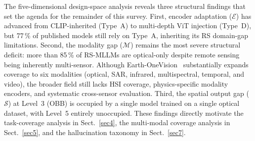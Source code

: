 The five-dimensional design-space analysis reveals three structural findings that set the
agenda for the remainder of this survey. First, encoder adaptation ($\mathcal{E}$) has
advanced from CLIP-inherited (Type~A) to multi-depth ViT injection (Type~D), but
77\,\% of published models still rely on Type~A, inheriting its RS domain-gap
limitations. Second, the modality gap ($\mathcal{M}$) remains the most severe structural
deficit: more than 85\,\% of RS-MLLMs are optical-only despite remote sensing being
inherently multi-sensor. Although Earth-OneVision~\cite{earthonevision2026} substantially
expands coverage to six modalities (optical, SAR, infrared, multispectral, temporal,
and video), the broader field still lacks HSI coverage, physics-specific modality
encoders, and systematic cross-sensor evaluation. Third, the spatial output gap ($\mathcal{S}$)
at Level~3 (OBB) is occupied by a single model trained on a single optical dataset,
with Level~5 entirely unoccupied. These findings directly motivate the task-coverage
analysis in
Sect.~\ref{sec4}, the multi-modal coverage analysis in Sect.~\ref{sec5}, and the
hallucination taxonomy in Sect.~\ref{sec7}.
